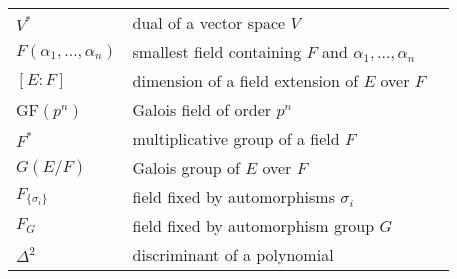 \begin{center}
\begin{longtable}{llr}
%
$V^\ast$ & dual of a vector space $V$ & \pageref{notedual} \\
%
$F( \alpha_1, \ldots, \alpha_n)$ & smallest field containing $F$ and $\alpha_1, \ldots, \alpha_n$ & \pageref{notefieldcont}\\
%
$[E:F]$ & dimension of a field extension of $E$ over $F$ & \pageref{notedegext} \\
%
GF$(p^n)$ & Galois field of order $p^n$ & \pageref{galoisfield} \\
%
$F^*$ & multiplicative group of a field $F$ & \pageref{ntmultgrp} \\
%
$G(E/F)$ & Galois group of $E$ over $F$ &\pageref{notegalois} \\
%
$F_{\{\sigma_i \}}$ & field fixed by automorphisms $\sigma_i$ & \pageref{noteFixedfield} \\
%
$F_G$ & field fixed by automorphism group $G$ & \pageref{noteFixedG} \\
%
$\Delta^2$ & discriminant of a polynomial & \pageref{discriminant}
%
\end{longtable}
\end{center}



